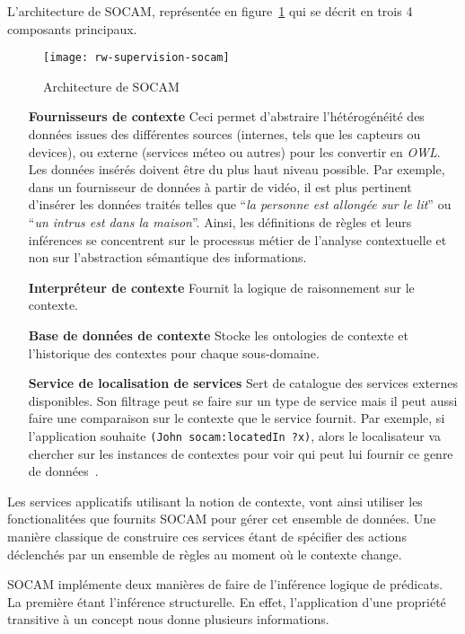 L'architecture de SOCAM, représentée en figure~\ref{fig:rw:supervision:socam} qui se décrit en trois 4 composants principaux.
\begin{figure}[ht]
    \centering
    \texttt{[image: rw-supervision-socam]}
    \caption{Architecture de SOCAM}\label{fig:rw:supervision:socam}
\end{figure}
\begin{itemize}
	\item[\textbf{Fournisseurs de contexte}] Ceci permet d'abstraire l'hétérogénéité des données issues des différentes sources (internes, tels que les capteurs ou devices), ou externe (services méteo ou autres) pour les convertir en \textit{OWL}. Les données insérés doivent être du plus haut niveau possible. Par exemple, dans un fournisseur de données à partir de vidéo, il est plus pertinent d'insérer les données traités telles que \enquote{\it la personne est allongée sur le lit} ou \enquote{\it un intrus est dans la maison}. Ainsi, les définitions de règles et leurs inférences se concentrent sur le processus métier de l'analyse contextuelle et non sur l'abstraction sémantique des informations.
    \item[\textbf{Interpréteur de contexte}] Fournit la logique de raisonnement sur le contexte.
    \item[\textbf{Base de données de contexte}] Stocke les ontologies de contexte et l'historique des contextes pour chaque sous-domaine.
    \item[\textbf{Service de localisation de services}] Sert de catalogue des services externes disponibles. Son filtrage peut se faire sur un type de service mais il peut aussi faire une comparaison sur le contexte que le service fournit. Par exemple, si l'application souhaite \verb|(John socam:locatedIn ?x)|, alors le localisateur va chercher sur les instances de contextes pour voir qui peut lui fournir ce genre de données~\cite{}.
\end{itemize}
Les services applicatifs utilisant la notion de contexte, vont ainsi utiliser les fonctionalitées que fournits SOCAM pour gérer cet ensemble de données. Une manière classique de construire ces services étant de spécifier des actions déclenchés par un ensemble de règles au moment où le contexte change.

SOCAM implémente deux manières de faire de l'inférence logique de prédicats. La première étant l'inférence structurelle. En effet, l'application d'une propriété transitive à un concept nous donne plusieurs informations. 

